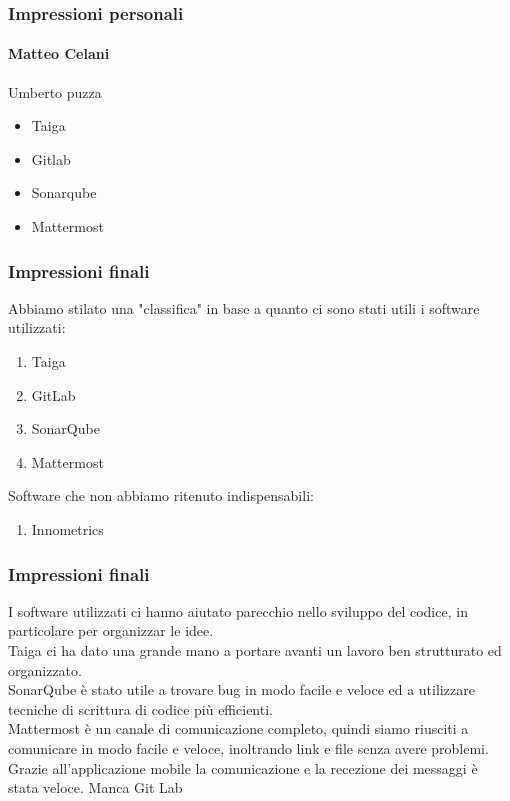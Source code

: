 \documentclass{beamer}
\begin{document}
\begin{frame}
\frametitle{Impressioni personali}
\framesubtitle{Matteo Celani}
Umberto puzza
\begin{itemize}
	\item Taiga
	\item Gitlab	
	\item Sonarqube
	\item Mattermost
  \end{itemize}
\end{frame}

\begin{frame}
\frametitle{Impressioni finali}
Abbiamo stilato una "classifica" in base a quanto ci sono stati utili i software utilizzati:
  \begin{enumerate}
	\item Taiga
	\item GitLab
	\item SonarQube
	\item Mattermost
  \end{enumerate}
  Software che non abbiamo ritenuto indispensabili:
  \begin{enumerate}
	\item Innometrics
  \end{enumerate}
\end{frame}

\begin{frame}
\frametitle{Impressioni finali}
I software utilizzati ci hanno aiutato parecchio nello sviluppo del codice, in particolare per organizzar le idee.\\
Taiga ci ha dato una grande mano a portare avanti un lavoro ben strutturato ed organizzato.\\
SonarQube è stato utile a trovare bug in modo facile e veloce ed a utilizzare tecniche di scrittura di codice più efficienti.\\
Mattermost è un canale di comunicazione completo, quindi siamo riusciti a comunicare in modo facile e veloce, inoltrando link e file senza avere problemi. Grazie all'applicazione mobile la comunicazione e la recezione dei messaggi è stata veloce.
Manca Git Lab
\end{frame}
\end{document}

